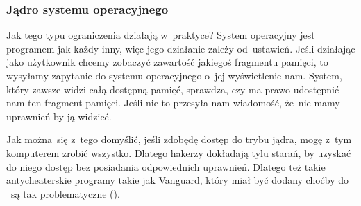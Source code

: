 \documentclass[10pt,t]{beamer}
\begin{document}
\begin{frame}
  \frametitle{Jądro systemu operacyjnego}


  Jak tego typu ograniczenia działają w~praktyce? System operacyjny jest
  programem jak każdy inny, więc jego działanie zależy od~ustawień. Jeśli
  działając jako użytkownik chcemy zobaczyć zawartość jakiegoś fragmentu
  pamięci, to wysyłamy zapytanie do systemu operacyjnego o~jej wyświetlenie
  nam. System, który zawsze widzi całą dostępną pamięć, sprawdza, czy ma
  prawo udostępnić nam ten fragment pamięci. Jeśli nie to przesyła nam
  wiadomość, że~nie mamy uprawnień by ją widzieć.

  Jak można~się z~tego domyślić, jeśli zdobędę dostęp do trybu jądra, mogę
  z~tym komputerem zrobić wszystko. Dlatego hakerzy dokładają tylu starań,
  by uzyskać do niego dostęp \alert{bez} posiadania odpowiednich uprawnień.
  Dlatego też takie antycheaterskie programy takie jak Vanguard, który miał
  być dodany choćby do
  ~są tak problematyczne
  (\parencite{Low-Level-Why-Riots-anti-cheat-is-a-HUGE-problem-Ver-2024}).




\end{frame}
\end{document}
